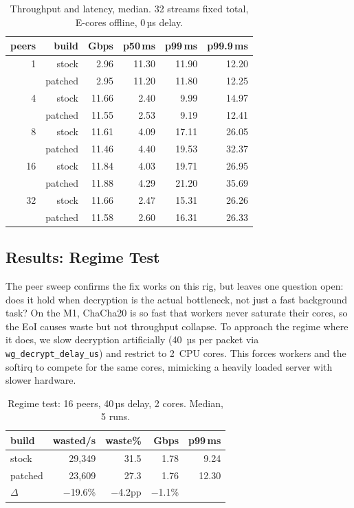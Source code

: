 \documentclass{article}
\begin{document}
\begin{table}[t]
\centering
\caption{Throughput and latency, median. 32 streams fixed total,
E-cores offline, 0\,µs delay.}
\label{tab:tput}
\small
\begin{tabular}{rrrrrr}
\toprule
peers & build & Gbps & p50\,ms & p99\,ms & p99.9\,ms \\
\midrule
1  & stock   & 2.96 & 11.30 & 11.90 & 12.20 \\
   & patched & 2.95 & 11.20 & 11.80 & 12.25 \\
\midrule
4  & stock   & 11.66 & 2.40 &  9.99 & 14.97 \\
   & patched & 11.55 & 2.53 &  9.19 & 12.41 \\
\midrule
8  & stock   & 11.61 & 4.09 & 17.11 & 26.05 \\
   & patched & 11.46 & 4.40 & 19.53 & 32.37 \\
\midrule
16 & stock   & 11.84 & 4.03 & 19.71 & 26.95 \\
   & patched & 11.88 & 4.29 & 21.20 & 35.69 \\
\midrule
32 & stock   & 11.66 & 2.47 & 15.31 & 26.26 \\
   & patched & 11.58 & 2.60 & 16.31 & 26.33 \\
\bottomrule
\end{tabular}
\end{table}

\subsection{Results: Regime Test}
\label{subsec:regime}

The peer sweep confirms the fix works on this rig, but leaves one question
open: does it hold when decryption is the actual bottleneck, not just a fast
background task? On the M1, ChaCha20 is so fast that workers never saturate
their cores, so the EoI causes waste but not throughput collapse. To approach
the regime where it does, we slow decryption artificially (40~µs per packet via
\texttt{wg\_decrypt\_delay\_us}) and restrict to 2~CPU cores. This forces
workers and the softirq to compete for the same cores, mimicking a heavily
loaded server with slower hardware.

\begin{table}[t]
\centering
\caption{Regime test: 16 peers, 40\,µs delay, 2 cores. Median, 5 runs.}
\label{tab:regime}
\small
\begin{tabular}{lrrrr}
\toprule
build & wasted/s & waste\% & Gbps & p99\,ms \\
\midrule
stock    & 29,349 & 31.5 & 1.78 &  9.24 \\
patched  & 23,609 & 27.3 & 1.76 & 12.30 \\
$\Delta$ & $-$19.6\% & $-$4.2pp & $-$1.1\% & \\
\bottomrule
\end{tabular}
\end{table}
\end{document}
